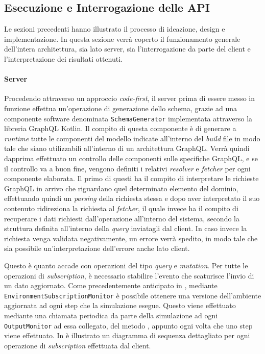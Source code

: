 \subsection{Esecuzione e Interrogazione delle API}\label{ssec:apis-functioning}
Le sezioni precedenti hanno illustrato il processo di ideazione, design e implementazione. In questa sezione verrà coperto il funzionamento generale dell'intera architettura,
sia lato server, sia l'interrogazione da parte del client e l'interpretazione dei risultati ottenuti.

\paragraph{Server}
Procedendo attraverso un approccio \textit{code-first}, il server prima di essere messo in funzione effettua un'operazione di generazione dello schema, grazie ad una componente
software denominata \texttt{SchemaGenerator} implementata attraverso la libreria GraphQL Kotlin. Il compito di questa componente è di generare a \textit{runtime} tutte le componenti
del modello indicate all'interno del \textit{build} file in modo tale che siano utilizzabili all'interno di un architettura GraphQL. Verrà quindi dapprima effettuato un controllo
delle componenti sulle specifiche GraphQL, e se il controllo va a buon fine, vengono definiti i relativi \textit{resolver} e \textit{fetcher} per ogni componente elaborata.
Il primo di questi ha il compito di interpretare le richieste GraphQL in arrivo che riguardano quel determinato elemento del dominio, effettuando quindi un \textit{parsing}
della richiesta stessa e dopo aver interpretato il suo contenuto ridireziona la richiesta al \textit{fetcher}, il quale invece ha il compito di recuperare i dati
richiesti dall'operazione all'interno del sistema, secondo la struttura definita all'interno della \textit{query} inviatagli dal client. In caso invece la richiesta venga validata
negativamente, un errore verrà spedito, in modo tale che sia possibile un'interpretazione dell'errore anche lato client.

Questo è quanto accade con operazioni del tipo \textit{query} e \textit{mutation}. Per tutte le operazioni di \textit{subscription}, è necessario stabilire l'evento che scaturisce
l'invio di un dato aggiornato. Come precedentemente anticipato in , mediante \texttt{EnvironmentSubscriptionMonitor} è possibile ottenere una versione
dell'ambiente aggiornata ad ogni step che la simulazione esegue. Questo viene effettuato mediante una chiamata periodica da parte della simulazione ad ogni \texttt{OutputMonitor}
ad essa collegato, del metodo , appunto ogni volta che uno step viene effettuato. In  è illustrato un diagramma di sequenza dettagliato
per ogni operazione di \textit{subscription} effettuata dal client.

